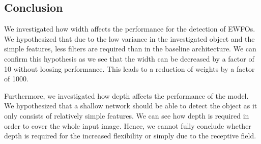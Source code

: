 \subsection{Conclusion}

We investigated how width affects the performance for the detection of \acp{EWFO}. We hypothesized that due to the low variance in the investigated object and the simple features, less filters are required than in the baseline architecture. We can confirm this hypothesis as we see that the width can be decreased by a factor of 10 without loosing performance. This leads to a reduction of weights by a factor of 1000. 

Furthermore, we investigated how depth affects the performance of the model. We hypothesized that a shallow network should be able to detect the object as it only consists of relatively simple features. We can see how depth is required in order to cover the whole input image. Hence, we cannot fully conclude whether depth is required for the increased flexibility or simply due to the receptive field. 





